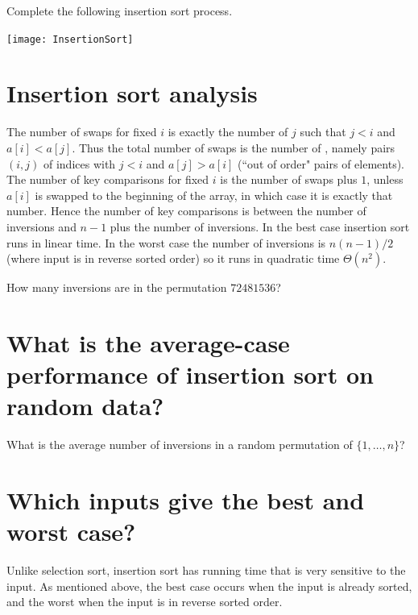 \begin{Boxample}[0]
Complete the following insertion sort process.
\begin{center}
\texttt{[image: InsertionSort]}
\end{center}
\end{Boxample}


\section{Insertion sort analysis}
The number of swaps for fixed $i$ is exactly the number of $j$ such that $j < i$ and $a[i] < a[j]$.
Thus the total number of swaps is the number of ,
namely pairs $(i, j)$ of indices with $j < i$ and $a[j] > a[i]$ (``out of order" pairs of elements).
The number of key comparisons for fixed $i$ is the number of swaps plus $1$, unless $a[i]$ is swapped to the beginning of the array, in which case it is exactly that number.
Hence the number of key comparisons is between the number of inversions and $n-1$ plus the number of inversions.
In the best case insertion sort runs in linear time.
In the worst case the number of inversions is $n(n-1)/2$ 
(where input is in reverse sorted order) so it runs in quadratic time $\Theta(n^2)$.

\begin{Boxample}[4]
How many inversions are in the permutation $72481536$?
\end{Boxample}

\section{What is the average-case performance of insertion sort on random data?}

\begin{Boxample}[6]
What is the average number of inversions in a random permutation of $\{1,\dots, n\}$?
\end{Boxample}

\section{Which inputs give the best and worst case?}
Unlike selection sort, insertion sort has running time that is very sensitive to the input. 
As mentioned above, the best case occurs when the input is already sorted, and the worst when the input is in reverse sorted order.

